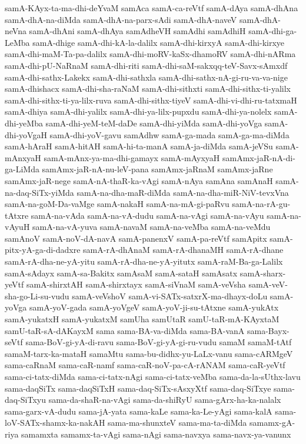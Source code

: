 {samA-KAyx-ta-ma-dhi-deYvaM
samAca
samA-ca-reVtf
samA-dAya
samA-dhAna
samA-dhA-na-diMda
samA-dhA-na-parx-sAdi
samA-dhA-naveV
samA-dhA-neVna
samA-dhAni
samA-dhAya
samAdheVH
samAdhi
samAdhiH
samA-dhi-ga-LeMba
samA-dhige
samA-dhi-kA-la-dalilx
samA-dhi-kirxyA
samA-dhi-kirxye
samA-dhi-maM-Ta-pa-dalilx
samA-dhi-moRV-kaSx-dhamoRV
samA-dhi-nARma
samA-dhi-pU-NaRnaM
samA-dhi-riti
samA-dhi-saM-sakxqq-teV-Savx-sAmxdf
samA-dhi-sathx-Lakekx
samA-dhi-sathxla
samA-dhi-sathx-nA-gi-ru-va-va-nige
samA-dhishacx
samA-dhi-sha-raNaM
samA-dhi-sithxti
samA-dhi-sithx-ti-yalilx
samA-dhi-sithx-ti-ya-lilx-ruva
samA-dhi-sithx-tiyeV
samA-dhi-vi-dhi-ru-tatxmaH
samA-dhiya
samA-dhi-yalilx
samA-dhi-ya-lilx-pupxdu
samA-dhi-ya-nolelx
samA-dhi-yeMba
samA-dhi-yeM-teM-daDe
samA-dhi-yiMda
samA-dhi-yoVga
samA-dhi-yoVgaH
samA-dhi-yoV-gavu
samAdhw
samA-ga-mada
samA-ga-ma-diMda
samA-hAraH
samA-hitAH
samA-hi-ta-manA
samA-ja-diMda
samA-jeVSu
samA-mAnxyaH
samA-mAnx-ya-ma-dhi-gamayx
samA-mAyxyaH
samAmx-jaR-nA-di-ga-LiMda
samAmx-jaR-nA-nu-leV-pana
samAmx-jaRnaM
samAmx-jaRne
samAmx-jaR-nege
samA-nA-thaR-ka-vAgi
samA-nAya
samAna
samAnaH
samA-na-daq-SiTx-yiMda
samA-na-dha-maR-diMda
samA-na-dha-miR-NiV-tevxVna
samA-na-goM-Da-vaMge
samA-nakaH
samA-na-mA-gi-paRvu
samA-na-rA-gu-tAtxre
samA-na-vAda
samA-na-vA-dudu
samA-na-vAgi
samA-na-vAyu
samA-na-vAyuH
samA-na-vA-yuva
samA-navaM
samA-na-veMba
samA-na-veMdu
samAnoV
samA-noV-dA-navA
samA-panenxV
samA-pa-reVtf
samApitx
samA-pitx-yA-ga-di-dadxre
samA-rA-dhAnaM
samA-rA-dhanaMH
samA-rA-dhane
samA-rA-dha-ne-yA-yitu
samA-rA-dha-ne-yA-yitutx
samA-raM-Ba-ga-Lalilx
samA-sAdayx
samA-sa-Bakitx
samAsaM
samA-sataH
samAsatx
samA-sharx-yeVtf
samA-shirxtAH
samA-shirxtayx
samA-siVnaM
samA-veVsha
samA-veV-sha-go-Li-su-vudu
samA-veVshoV
samA-vi-SATx-satxrX-ma-dhayx-doLu
samA-yoVga
samA-yoV-gada
samA-yoVgeV
samA-yoV-ji-su-tAtxne
samA-yukAtx
samA-yukatxH
samA-yukatxM
samUha
samUtaR
samU-taR-mA-KAyxtaM
samU-taR-sA-dAKayxM
sama
sama-BA-va-diMda
sama-BA-vanA
sama-Bayx-seVtf
sama-BoV-gi-yA-di-ravu
sama-BoV-gi-yA-gi-ru-vudu
samaM
samaM-tAtf
samaM-tarx-ka-mataH
samaMtu
sama-bu-didhx-yu-LaLx-vanu
sama-cARMgeV
sama-caRnaM
sama-caR-namf
sama-caR-noV-pa-cA-rANAM
sama-caR-yeVtf
sama-ci-tatx-diMda
sama-ci-tatx-nAgi
sama-ci-tatx-veMba
sama-da-la-sUthx-lavu
sama-daqSiTx
sama-daqSiTxH
sama-daq-SiTx-sAsxyXtf
sama-daq-SiTxye
sama-daq-SiTxyu
sama-da-shaR-na-vAgi
sama-da-shiRyU
sama-gArx-ha-ka-nalalx
sama-garx-vA-dudu
sama-jA-yata
sama-kaLe
sama-ka-Le-yAgi
sama-kalA
sama-loV-SATx-shamx-ka-nakAH
sama-ma-shunxteV
sama-ma-ta-diMda
samamx-gA-riya
samamxta
samamx-ta-vAgi
sama-nAgi
sama-navxya
sama-navx-ya-vanunx
}

